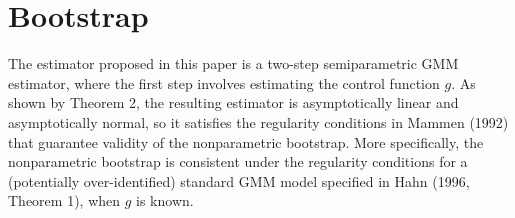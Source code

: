\documentclass[12pt]{article}
\newcommand{\toP}{\overset{p}{\to}}
\newcommand{\meanN}{\frac{1}{n}\sum_{i=1}^n}
\newcommand{\sumL}{\sum_{\ell=1}^{L_i}}
\begin{document}










\section{Bootstrap}

The estimator proposed in this paper is a two-step semiparametric GMM estimator, where the first step involves estimating the control function $g$.  As shown by Theorem 2, the resulting estimator is asymptotically linear and asymptotically normal, so it satisfies the regularity conditions in Mammen (1992) that guarantee validity of the nonparametric bootstrap.  More specifically, the nonparametric bootstrap is consistent under the regularity conditions for a (potentially over-identified) standard GMM model specified in Hahn (1996, Theorem 1), when $g$ is known. 
 
\end{document}
